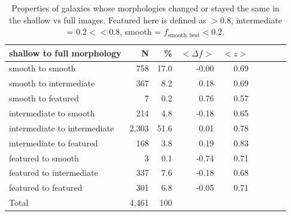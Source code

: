 \documentclass[twocolumn]{aastex6}
\begin{document}
\begin{table}
\caption{Properties of galaxies whose morphologies changed or stayed the same in the shallow vs full images. Featured here is defined as \fbest$>0.8$, intermediate = $0.2<$\fbest$<0.8$, smooth = $f_\mathrm{smooth,best}<0.2$. \label{tbl:shallow_to_full_stats}}
\begin{tabular}{lrrrrrrrr}
\hline\hline
shallow to full morphology    & N       & \%       & $<\Delta f>$ & $<z>$ \\
\hline
smooth to smooth              & 758     & 17.0     & -0.00        &  0.69\\
smooth to intermediate        & 367     & 8.2      & 0.18         &  0.69\\
smooth to featured            & 7       & 0.2      & 0.76         &  0.57\\ 
intermediate to smooth        & 214     & 4.8      & -0.18        &  0.65\\
intermediate to intermediate  & 2,303   & 51.6     & 0.01         &  0.78 \\
intermediate to featured      & 168     & 3.8      & 0.19         &  0.83\\
featured to smooth            & 3       & 0.1      & -0.74        &  0.71\\
featured to intermediate      & 337     & 7.6      & -0.18        &  0.68\\
featured to featured          & 301     & 6.8      & -0.05        &  0.71\\

Total                         & 4,461   & 100      &              & \\
\hline\hline
\end{tabular}
\end{table}
\end{document}
